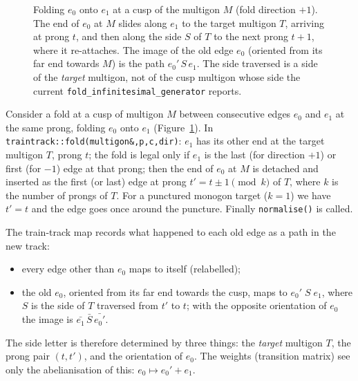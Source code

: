 \documentclass[12pt]{amsart}
\newcommand{\anti}[1]{\bar{#1}}          %
\newcommand{\code}[1]{\texttt{#1}}
\theoremstyle{plain}
\theoremstyle{definition}
\begin{document}
\begin{figure}[t]
  \caption{Folding $e_0$ onto $e_1$ at a cusp of the multigon $M$ (fold
    direction $+1$).  The end of $e_0$ at $M$ slides along $e_1$ to the
    target multigon $T$, arriving at prong $t$, and then along the side $S$
    of $T$ to the next prong $t+1$, where it re-attaches.  The image of the
    old edge $e_0$ (oriented from its far end towards $M$) is the path
    $e_0'\,S\,e_1$.  The side traversed is a side of the \emph{target}
    multigon, not of the cusp multigon whose side the current
    \code{fold\_infinitesimal\_generator} reports.}
  \label{fig:fold}
\end{figure}

Consider a fold at a cusp of multigon $M$ between consecutive edges $e_0$
and $e_1$ at the same prong, folding $e_0$ onto $e_1$
(Figure~\ref{fig:fold}).  In \code{traintrack::fold(multigon\&,p,c,dir)}:
$e_1$ has its other end at the target multigon $T$, prong $t$; the fold is
legal only if $e_1$ is the last (for direction $+1$) or first (for $-1$)
edge at that prong; then the end of $e_0$ at $M$ is detached and inserted
as the first (or last) edge at prong $t' = t \pm 1 \pmod k$ of $T$, where
$k$ is the number of prongs of $T$.  For a punctured monogon target
($k=1$) we have $t'=t$ and the edge goes once around the puncture.  Finally
\code{normalise()} is called.

The train-track map records what happened to each old edge as a path in
the new track:
\begin{itemize}
  \item every edge other than $e_0$ maps to itself (relabelled);
  \item the old $e_0$, oriented from its far end towards the cusp, maps to
    $e_0'\; S\; e_1$, where $S$ is the side of $T$ traversed from $t'$ to
    $t$; with the opposite orientation of $e_0$ the image is
    $\anti{e_1}\,\anti S\,\anti{e_0'}$.
\end{itemize}
The side letter is therefore determined by three things: the \emph{target}
multigon $T$, the prong pair $(t,t')$, and the orientation of $e_0$.  The
weights (transition matrix) see only the abelianisation of this: $e_0
\mapsto e_0' + e_1$.
\end{document}
